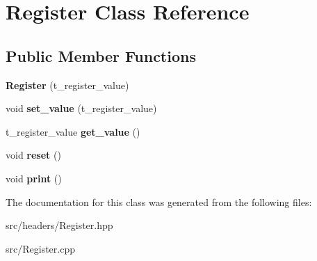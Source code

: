 \hypertarget{classRegister}{\section{Register Class Reference}
\label{classRegister}
}
\subsection*{Public Member Functions}
\begin{DoxyCompactItemize}
\item 
\hypertarget{classRegister_aaf6b622206afd2e9646a6da08c68e958}{{\bfseries Register} (t\-\_\-register\-\_\-value)}\label{classRegister_aaf6b622206afd2e9646a6da08c68e958}

\item 
\hypertarget{classRegister_a01d391e6f2251d6aae7176c4c1c05a0c}{void {\bfseries set\-\_\-value} (t\-\_\-register\-\_\-value)}\label{classRegister_a01d391e6f2251d6aae7176c4c1c05a0c}

\item 
\hypertarget{classRegister_a1c1996453221cc2536466887e891992d}{t\-\_\-register\-\_\-value {\bfseries get\-\_\-value} ()}\label{classRegister_a1c1996453221cc2536466887e891992d}

\item 
\hypertarget{classRegister_a4a354186661756dee96799db1219a20a}{void {\bfseries reset} ()}\label{classRegister_a4a354186661756dee96799db1219a20a}

\item 
\hypertarget{classRegister_a8e738fe7c0bb54be62bf084abf347e7d}{void {\bfseries print} ()}\label{classRegister_a8e738fe7c0bb54be62bf084abf347e7d}

\end{DoxyCompactItemize}


The documentation for this class was generated from the following files\-:\begin{DoxyCompactItemize}
\item 
src/headers/Register.\-hpp\item 
src/Register.\-cpp\end{DoxyCompactItemize}
